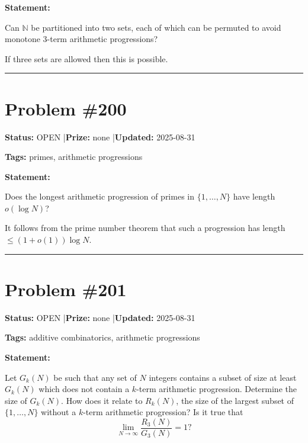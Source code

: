 \documentclass{article}
\begin{document}
\medskip

\noindent\textbf{Statement:}

Can $\mathbb{N}$ be partitioned into two sets, each of which can be permuted to avoid monotone 3-term arithmetic progressions?




If three sets are allowed then this is possible.

\noindent\rule{\linewidth}{0.4pt}


\section{Problem \#200}
\label{prob:200}

\noindent\textbf{Status:} OPEN \quad|\quad \textbf{Prize:} none \quad|\quad \textbf{Updated:} 2025-08-31

\noindent\textbf{Tags:} primes, arithmetic progressions

\medskip

\noindent\textbf{Statement:}

Does the longest arithmetic progression of primes in $\{1,\ldots,N\}$ have length $o(\log N)$?




It follows from the prime number theorem that such a progression has length $\leq(1+o(1))\log N$.

\noindent\rule{\linewidth}{0.4pt}


\section{Problem \#201}
\label{prob:201}

\noindent\textbf{Status:} OPEN \quad|\quad \textbf{Prize:} none \quad|\quad \textbf{Updated:} 2025-08-31

\noindent\textbf{Tags:} additive combinatorics, arithmetic progressions

\medskip

\noindent\textbf{Statement:}

Let $G_k(N)$ be such that any set of $N$ integers contains a subset of size at least $G_k(N)$ which does not contain a $k$-term arithmetic progression. Determine the size of $G_k(N)$. How does it relate to $R_k(N)$, the size of the largest subset of $\{1,\ldots,N\}$ without a $k$-term arithmetic progression? Is it true that\[\lim_{N\to \infty}\frac{R_3(N)}{G_3(N)}=1?\]
\end{document}
